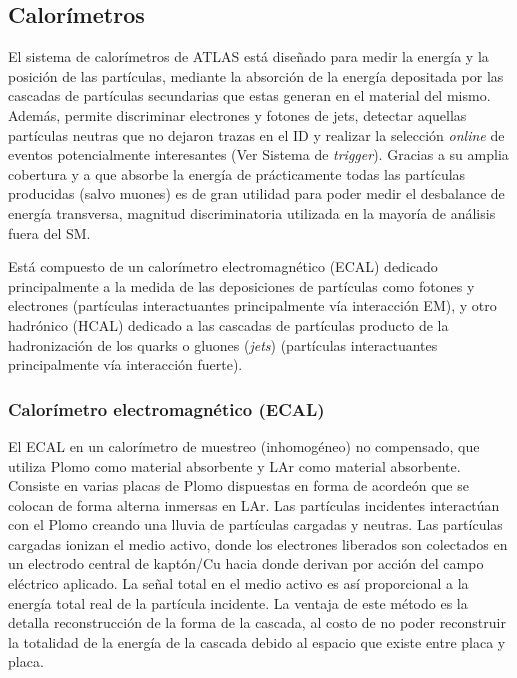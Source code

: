 \subsection{Calorímetros}

El sistema de calorímetros de ATLAS está diseñado para medir la energía y la posición de las partículas, mediante la absorción de la energía depositada por las cascadas de partículas secundarias que estas generan en el material del mismo. Además, permite discriminar electrones y fotones de jets, detectar aquellas partículas neutras que no dejaron trazas en el ID y realizar la selección \textit{online} de eventos potencialmente interesantes (Ver Sistema de \textit{trigger}). Gracias a su amplia cobertura y a que absorbe la energía de prácticamente todas las partículas producidas (salvo muones) es de gran utilidad para poder medir el desbalance de energía transversa, magnitud discriminatoria utilizada en la mayoría de análisis fuera del SM.

Está compuesto de un calorímetro electromagnético (ECAL) dedicado principalmente a la medida de las deposiciones de partículas como fotones y electrones (partículas interactuantes principalmente vía interacción EM), y otro hadrónico (HCAL) dedicado a las cascadas de partículas producto de la hadronización de los quarks o gluones (\textit{jets}) (partículas interactuantes principalmente vía interacción fuerte).

\subsubsection{Calorímetro electromagnético (ECAL)}

El ECAL en un calorímetro de muestreo (inhomogéneo) no compensado, que utiliza Plomo como material absorbente y LAr como material absorbente. Consiste en varias placas de Plomo dispuestas en forma de acordeón que se colocan de forma alterna inmersas en LAr. Las partículas incidentes interactúan con el Plomo creando una lluvia de partículas cargadas y neutras. Las partículas cargadas ionizan el medio activo, donde los electrones liberados son colectados en un electrodo central de kaptón/Cu hacia donde derivan por acción del campo eléctrico aplicado. La señal total en el medio activo es así proporcional a la energía total real de la partícula incidente. La ventaja de este método es la detalla reconstrucción de la forma de la cascada, al costo de no poder reconstruir la totalidad de la energía de la cascada debido al espacio que existe entre placa y placa.


